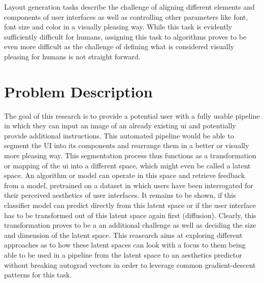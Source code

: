 \documentclass[10pt,a4paper]{scrartcl} %
\begin{document}
Layout generation tasks describe the challenge of aligning different elements and components
of user interfaces as well as controlling other parameters like font, font size and color
in a visually pleasing way. While this task is evidently sufficiently difficult
for humans, assigning this task to algorithms proves to be even more difficult as the challenge
of defining what is considered visually pleasing for humans is not straight forward.

\section{Problem Description}
The goal of this research is to provide a potential user with a fully usable pipeline in
 which they can input an image of an already existing \ac{ui} and potentially provide 
 additional instructions. This automated pipeline would be able to segment the \ac{UI} into
 its components and rearrange them in a better or visually more pleasing way. This segmentation
 process thus functions as a transformation or mapping of the \ac{ui} into a different space,
 which might even be called a latent space. An algorithm or model can operate in this space
 and retrieve feedback from a model, pretrained on a dataset in which users have been interrogated
 for their perceived aesthetics of user interfaces. It remains to be shown, if this classifier
 model can predict directly from this latent space or if the user interface has to be transformed 
 out of this latent space again first (diffusion). Clearly, this transformation proves to be a an
 additional challenge as well as deciding the size and dimension of the latent space. This reasearch
 aims at exploring different approaches as to how these latent spaces can look with a focus to them
 being able to be used in a pipeline from the latent space to an aesthetics predictor without
 breaking autograd vectors in order to leverage common gradient-descent patterns for this task.
\end{document}
